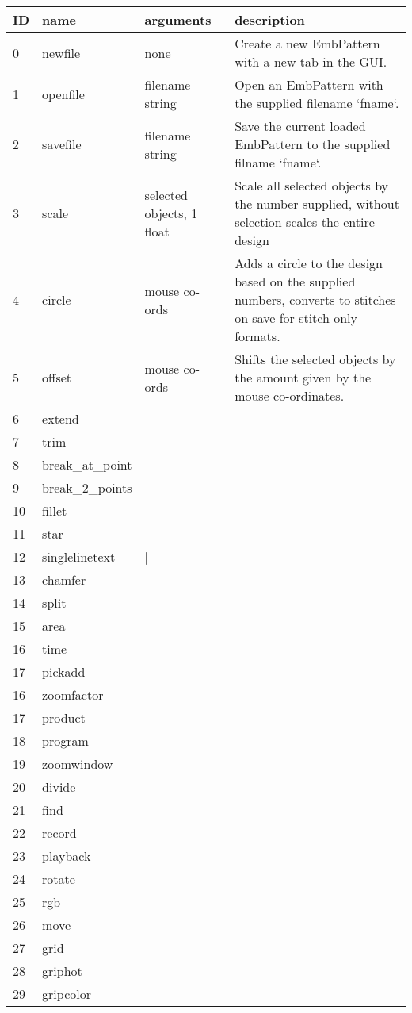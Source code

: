 
\begin{longtable}{l l l p{8cm}}
\textbf{ID} & \textbf{name} & \textbf{arguments} & \textbf{description} \\
\hline
0 & newfile & none & Create a new EmbPattern with a new tab in the GUI. \\
1 & openfile & filename string & Open an EmbPattern with the supplied filename `fname`. \\
2 & savefile & filename string & Save the current loaded EmbPattern to the supplied filname `fname`. \\
3 & scale & selected objects, 1 float & Scale all selected objects by the number supplied, without selection scales the entire design \\
4 & circle & mouse co-ords & Adds a circle to the design based on the supplied numbers, converts to stitches on save for stitch only formats. \\
5 & offset & mouse co-ords & Shifts the selected objects by the amount given by the mouse co-ordinates. \\
6 & extend & & \\
7 & trim & & \\
8 & break\_at\_point & & \\
9 & break\_2\_points & & \\
10 & fillet & & \\
11 & star & & \\
12 & singlelinetext & | \\
13 & chamfer & & \\
14 & split & & \\
15 & area & & \\
16 & time & & \\
17 & pickadd & & \\
16 & zoomfactor & & \\
17 & product & & \\
18 & program & & \\
19 & zoomwindow & & \\
20 & divide & & \\
21 & find & & \\
22 & record & & \\
23 & playback & & \\
24 & rotate & & \\
25 & rgb & & \\
26 & move & & \\
27 & grid & & \\
28 & griphot &  & \\
29 & gripcolor & & \\

\end{longtable}
